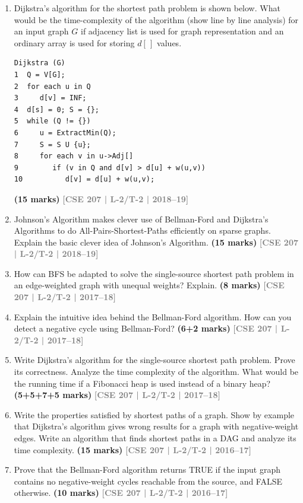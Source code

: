 \documentclass[12pt,a3paper]{article}
\newcommand{\yr}[1]{\hfill\textcolor{gray}{\small\textbf{[#1]}}}
\newcommand{\mk}[1]{\textcolor{orange!70!black}{\small\textbf{(#1 marks)}}}
\begin{document}
\begin{enumerate}
\item Dijkstra's algorithm for the shortest path problem is shown below. What would be the time-complexity of the algorithm (show line by line analysis) for an input graph $G$ if adjacency list is used for graph representation and an ordinary array is used for storing $d[\,]$ values.
 
\begin{lstlisting}
Dijkstra (G)
1  Q = V[G];
2  for each u in Q
3     d[v] = INF;
4  d[s] = 0; S = {};
5  while (Q != {})
6     u = ExtractMin(Q);
7     S = S U {u};
8     for each v in u->Adj[]
9        if (v in Q and d[v] > d[u] + w(u,v))
10          d[v] = d[u] + w(u,v);
\end{lstlisting}
\mk{15} \yr{CSE 207 | L-2/T-2 | 2018--19}

\item Johnson's Algorithm makes clever use of Bellman-Ford and Dijkstra's Algorithms to do All-Pairs-Shortest-Paths efficiently on sparse graphs. Explain the basic clever idea of Johnson's Algorithm.
\mk{15} \yr{CSE 207 | L-2/T-2 | 2018--19}

\item How can BFS be adapted to solve the single-source shortest path problem in an edge-weighted graph with unequal weights? Explain. 
\mk{8} \yr{CSE 207 | L-2/T-2 | 2017--18}

\item Explain the intuitive idea behind the Bellman-Ford algorithm. How can you detect a negative cycle using Bellman-Ford? \mk{6+2}
\yr{CSE 207 | L-2/T-2 | 2017--18}

\item Write Dijkstra's algorithm for the single-source shortest path problem. Prove its correctness. Analyze the time complexity of the algorithm. What would be the running time if a Fibonacci heap is used instead of a binary heap? \mk{5+5+7+5}
\yr{CSE 207 | L-2/T-2 | 2017--18}

\item Write the properties satisfied by shortest paths of a graph. Show by example that Dijkstra's algorithm gives wrong results for a graph with negative-weight edges. Write an algorithm that finds shortest paths in a DAG and analyze its time complexity. \mk{15}
\yr{CSE 207 | L-2/T-2 | 2016--17}

\item Prove that the Bellman-Ford algorithm returns TRUE if the input graph contains no negative-weight cycles reachable from the source, and FALSE otherwise. \mk{10}
\yr{CSE 207 | L-2/T-2 | 2016--17}


\end{enumerate}
\end{document}
